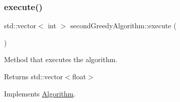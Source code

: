 \subsubsection{\texorpdfstring{execute()}{execute()}}
{\footnotesize\ttfamily std\+::vector$<$ int $>$ second\+Greedy\+Algorithm\+::execute (\begin{DoxyParamCaption}{ }\end{DoxyParamCaption})\hspace{0.3cm}{\ttfamily [virtual]}}



Method that executes the algorithm. 

\begin{DoxyReturn}{Returns}
std\+::vector$<$float$>$ 
\end{DoxyReturn}


Implements \hyperlink{classAlgorithm_af6ea9eb9a6dbd41896e3fd7dabac096b}{Algorithm}.


